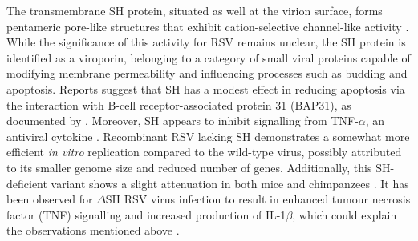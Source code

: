 The transmembrane SH protein, situated as well at the virion surface, forms pentameric pore-like structures that exhibit cation-selective channel-like activity \cite{Carter2010DirectPermeability, Gan2012TheChannels}. While the significance of this activity for RSV remains unclear, the SH protein is identified as a viroporin, belonging to a category of small viral proteins capable of modifying membrane permeability and influencing processes such as budding and apoptosis. Reports suggest that SH has a modest effect in reducing apoptosis via the interaction with B-cell receptor-associated protein 31 (BAP31), as documented by \cite{Fuentes2007FunctionProtein}. Moreover, SH appears to inhibit signalling from TNF-\(\alpha\), an antiviral cytokine \cite{Fuentes2007FunctionProtein}. Recombinant RSV lacking SH demonstrates a somewhat more efficient \textit{in vitro} replication compared to the wild-type virus, possibly attributed to its smaller genome size and reduced number of genes. Additionally, this SH-deficient variant shows a slight attenuation in both mice and chimpanzees \cite{Whitehead1999RecombinantChimpanzees}. It has been observed for \(\Delta\)SH RSV virus infection to result in enhanced tumour necrosis factor (TNF) signalling and increased production of IL-1\(\beta\), which could explain the observations mentioned above \cite{Pollock2017ModulationProtein}. 

